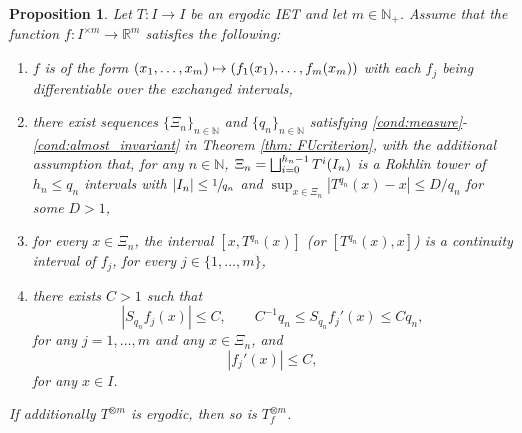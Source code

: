 \documentclass[10pt,a4paper]{article}
\newenvironment{enumeratei}
{\bgroup\def\theenumi{\roman{enumi}}\def\theenumii{\arabic{enumii}}\begin{enumerate}}
{\end{enumerate}\egroup}
\newcommand\mto{\mathchoice{\longmapsto}{\mapsto}{\mapsto}{\mapsto}}
\let\oldbigsqcup\bigsqcup
\renewcommand{\bigsqcup}{\mathop{\textstyle\oldbigsqcup}\displaylimits}
\theoremstyle{plain}
\newtheorem{proposition}[theorem]{Proposition}
\theoremstyle{definition}
\newcommand{\N}{\mathbb{N}}
\newcommand{\R}{\mathbb{R}}
\begin{document}
\begin{proposition}\label{prop: effcriterion}
Let $T:I\to I$ be an ergodic IET and let $m\in \N_+$. Assume that the function $f:I^{\times m}\to \R^{m}$ satisfies the following:
\begin{enumeratei}
\item \label{cond:continuity} $f$ is of the form $(x_1,\ldots,x_m)\mto (f_1(x_1),\ldots,f_m(x_m))$ with each $f_j$ being differentiable over the exchanged intervals,
\item \label{cond:sequences} there exist sequences $\{\Xi_n\}_{n\in\N}$ and $\{q_n\}_{n\in\N}$ satisfying \eqref{cond:measure}-\eqref{cond:almost_invariant} in Theorem \ref{thm: FUcriterion}, with the additional assumption that, for any $n \in \N$, $\Xi_n=\bigsqcup_{i=0}^{h_n-1}T^{i}({I_n})$ is a Rokhlin tower of $h_n\le q_n$ intervals with $|I_n|\le\sfrac{1}{q_n}$ and $\sup_{x\in \Xi_n}|T^{q_n}(x)-x|\le D/q_n$ for some $D>1$,
\item \label{cond:cont_interval} for every $x\in\Xi_n$, the interval $[x,T^{q_n}(x)]$ (or $[T^{q_n}(x),x]$) is a continuity interval of $f_j$, for every $j\in\{1,\ldots,m\}$,
\item \label{cond:derivative} there exists $C>1$ such that
\[
|S_{q_n}f_j(x)|\le C, \qquad C^{-1}q_n\le S_{q_n}f_j'(x)\le Cq_n,
\]
for any $j=1,\ldots,m$ and any $x\in\Xi_n$, and
\[
|f_j'(x)|\le C,
\]
for any $x\in I$.
\end{enumeratei}
If additionally $T^{\otimes m}$ is ergodic, then so is $T_f^{\otimes m}$.
\end{proposition}
\end{document}

